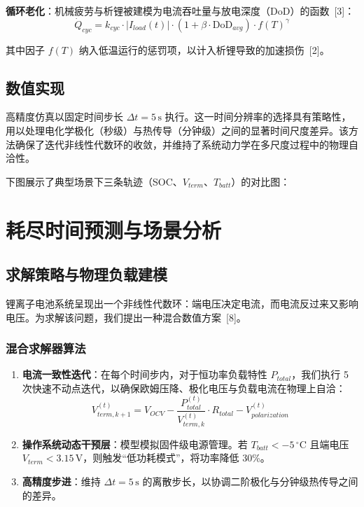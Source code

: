 \documentclass[11pt,a4paper]{ctexart}
\newcommand{\degC}{\ensuremath{^{\circ}\mathrm{C}}}
\begin{document}
\textbf{循环老化}：机械疲劳与析锂被建模为电流吞吐量与放电深度（DoD）的函数~[3]：
\begin{equation}
\dot{Q}_{cyc}=k_{cyc}\cdot|I_{load}(t)|\cdot(1+\beta\cdot \mathrm{DoD}_{avg})\cdot f(T)^{\gamma}
\end{equation}

其中因子 $f(T)$ 纳入低温运行的惩罚项，以计入析锂导致的加速损伤~[2]。

\subsection{数值实现}

高精度仿真以固定时间步长 $\Delta t=5\,\mathrm{s}$ 执行。这一时间分辨率的选择具有策略性，用以处理电化学极化（秒级）与热传导（分钟级）之间的显著时间尺度差异。该方法确保了迭代非线性代数环的收敛，并维持了系统动力学在多尺度过程中的物理自洽性。

下图展示了典型场景下三条轨迹（SOC、$V_{term}$、$T_{batt}$）的对比图：
\section{耗尽时间预测与场景分析}

\subsection{求解策略与物理负载建模}

锂离子电池系统呈现出一个非线性代数环：端电压决定电流，而电流反过来又影响电压。为求解该问题，我们提出一种混合数值方案~[8]。

\subsubsection{混合求解器算法}

\begin{enumerate}
\item \textbf{电流一致性迭代}：在每个时间步内，对于恒功率负载特性 $P_{total}$，我们执行 5 次快速不动点迭代，以确保欧姆压降、极化电压与负载电流在物理上自洽：
\begin{equation}
V_{term,k+1}^{(t)}=V_{OCV}-\frac{P_{total}^{(t)}}{V_{term,k}^{(t)}}\cdot R_{total}-V_{polarization}^{(t)}
\end{equation}
\item \textbf{操作系统动态干预层}：模型模拟固件级电源管理。若 $T_{batt}<-5\,\degC$ 且端电压 $V_{term}<3.15\,\mathrm{V}$，则触发“低功耗模式”，将功率降低 30\%。
\item \textbf{高精度步进}：维持 $\Delta t=5\,\mathrm{s}$ 的离散步长，以协调二阶极化与分钟级热传导之间的差异。
\end{enumerate}
\end{document}
